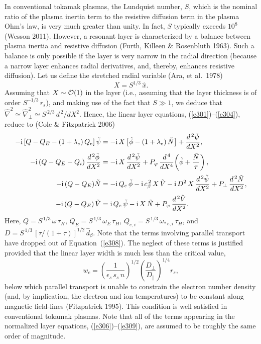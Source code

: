\documentclass[notitlepage,12pt]{article}
\begin{document}
In conventional tokamak plasmas, the Lundquist number, $S$, which is the nominal ratio of the plasma inertia term to the   resistive diffusion  term in the plasma Ohm's law, is very much greater than unity. In fact, $S$ typically exceeds $10^8$ (Wesson 2011). However, a resonant layer is
characterized by a balance between plasma inertia and resistive diffusion (Furth, Killeen \& Rosenbluth 1963). Such a balance is
only possible if the layer is very narrow in the radial direction (because a narrow layer enhances radial derivatives, and, thereby, enhances
resistive diffusion). Let us define the stretched radial variable (Ara, et al.\ 1978)
\begin{equation}
X = S^{1/3}\,\hat{x}.
\end{equation}
Assuming that $X\sim{\cal O}(1)$ in the layer (i.e., assuming that the layer thickness is of order $S^{-1/3}\,r_s$),
and making use of the fact that $S\gg 1$, we deduce that $\hat{\nabla}^2\simeq \hat{\nabla}_\perp^2\simeq S^{\,2/3}\,d^{\,2}/dX^2$.
Hence, the linear layer equations, (\ref{e301})--(\ref{e304}), reduce to (Cole \& Fitzpatrick 2006)
\begin{align}\label{e306}
-{\rm i}\,[Q-Q_E-(1+\lambda_e)\,Q_{e}]\,\tilde{\psi}&= - {\rm i}\,X\left[\tilde{\phi}-(1+\lambda_e)\,\tilde{N}\right] + \frac{d^{\,2}\tilde{\psi}}{d X^2},\\[0.5ex]
-{\rm i}\,(Q-Q_E -Q_{i})\,\frac{d^{\,2}\tilde{\phi}}{dX^2}&= - {\rm i}\,X\,\frac{d^{\,2}\tilde{\psi}}{dX^2}+ P_\varphi\,\frac{d^{\,4}}{dX^4}\!\left(\tilde{\phi} + \frac{\tilde{N}}{\tau}\right),\\[0.5ex]
-{\rm i}\,(Q-Q_E)\tilde{N} &= - {\rm i}\,Q_{e}\,\tilde{\phi} - {\rm i}\,c_\beta^{\,2}\,X\,\tilde{V}  - {\rm i} \,D^{2}\,X\,\frac{d^{\,2}\tilde{\psi}}{dX^{2}}
+ P_\perp\,\frac{d^{\,2} \tilde{N}}{dX^{2}},\label{e308}\\[0.5ex]
 -{\rm i}\,(Q-Q_E)\,\tilde{V} &= {\rm i}\,Q_{e}\,\tilde{\psi} - {\rm i}\,X\,\tilde{N} + P_\varphi\,\frac{d^{\,2}\tilde{V}}{dX^{2}}.\label{e309}
\end{align}
Here, $Q=S^{\,1/3}\,\omega\,\tau_H$, $Q_E = S^{\,1/3}\,\omega_E\,\tau_H$, $Q_{e,i} = S^{\,1/3}\,\omega_{\ast\,e,i}\,\tau_H$,
and $D = S^{\,1/3}\,[\tau/(1+\tau)]^{1/2}\,\hat{d}_\beta$. Note that the terms involving parallel transport have dropped out of
Equation~(\ref{e308}). The neglect of these terms is justified provided that the linear layer width is much less than the critical value,
\begin{equation}\label{wcdef}
w_c = \left(\frac{1}{\epsilon_s\,s_s\,n}\right)^{1/2}\left(\frac{D_\perp}{D_\parallel}\right)^{1/4}r_s,
\end{equation}
below which parallel transport is unable to constrain the electron number density (and, by implication, the electron and
ion temperatures) to be constant along magnetic field-lines (Fitzpatrick 1995). This condition is well satisfied in conventional
tokamak plasmas. 
Note that all of the terms appearing in the 
normalized layer equations, (\ref{e306})--(\ref{e309}), are assumed to be roughly the same order of magnitude. 
\end{document}
